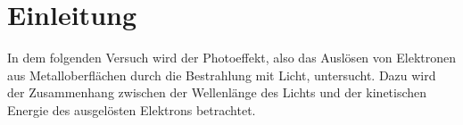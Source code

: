\section{Einleitung}
\label{sec:einleitung}
In dem folgenden Versuch wird der Photoeffekt, also das Auslösen von Elektronen aus Metalloberflächen durch die Bestrahlung mit Licht, 
untersucht. Dazu wird der Zusammenhang zwischen der Wellenlänge des Lichts und der kinetischen Energie des ausgelösten Elektrons betrachtet.
